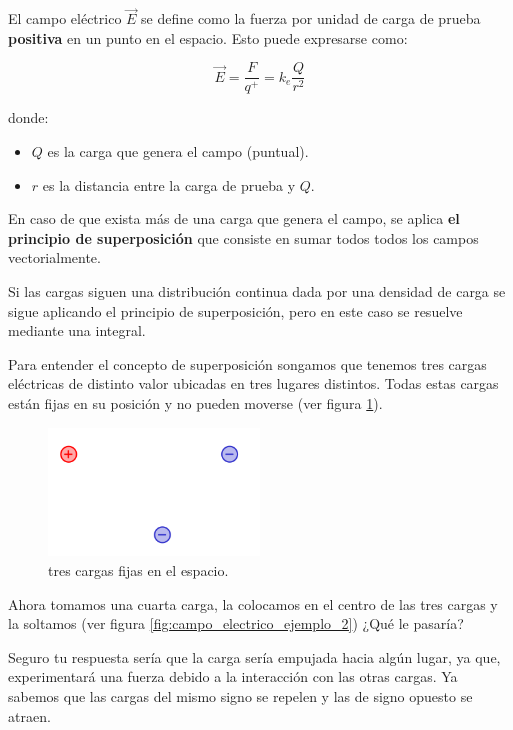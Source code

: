 El campo eléctrico \( \vec{E} \) se define como la fuerza por unidad de carga de prueba \textbf{positiva} en un punto en el espacio. Esto puede expresarse como:

\begin{equation}
    \vec{E} = \frac{F}{q^{+}} = k_e \frac{Q}{r^2}
\end{equation}

donde:
\begin{itemize}
    \item \( Q \) es la carga que genera el campo (puntual).
    \item \( r \) es la distancia entre la carga de prueba y \( Q \).
\end{itemize}

En caso de que exista más de una carga que genera el campo, se aplica \textbf{el principio de superposición} que consiste en sumar todos todos los campos vectorialmente.

Si las cargas siguen una distribución continua dada por una densidad de carga se sigue aplicando el principio de superposición, pero en este caso se resuelve mediante una integral.

Para entender el concepto de superposición songamos que tenemos tres cargas eléctricas de distinto valor ubicadas en tres lugares distintos. Todas estas cargas están fijas en su posición y no pueden moverse (ver figura \ref{fig:campo_electrico_ejemplo_1}). 

\begin{figure}[ht]
    \centering
    \includegraphics[width=0.5\textwidth]{images/field_ex_1.png}
    \caption{tres cargas fijas en el espacio.}
    \label{fig:campo_electrico_ejemplo_1}
\end{figure}

Ahora tomamos una cuarta carga, la colocamos en el centro de las tres cargas y la soltamos (ver figura \ref{fig:campo_electrico_ejemplo_2}) ¿Qué le pasaría? 

Seguro tu respuesta sería que la carga sería empujada hacia algún lugar, ya que, experimentará una fuerza debido a la interacción con las otras cargas. Ya sabemos que las cargas del mismo signo se repelen y las de signo opuesto se atraen.

